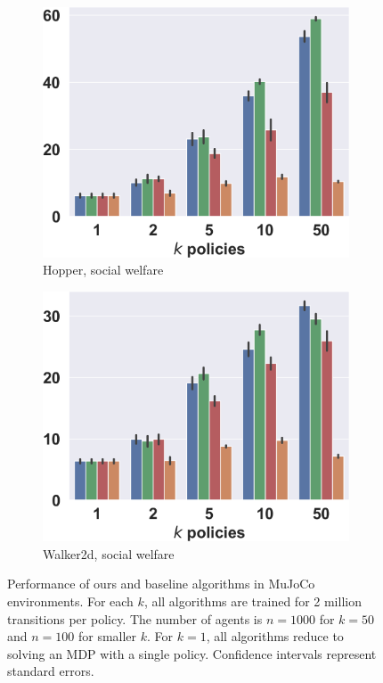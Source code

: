 \documentclass[letterpaper]{article} %
\begin{document}
\begin{figure}[t]
\begin{center}
\begin{subfigure}{0.245\textwidth}
    \end{subfigure}
    \hfill%
    \begin{subfigure}{0.245\textwidth}
        \centering
        \caption{Hopper, social welfare}
        \includegraphics[width=\linewidth]{pics/Hopper-v4_bars.png}
    \end{subfigure}%
    \hfill%
    \begin{subfigure}{0.245\textwidth}
        \centering
        \caption{Walker2d, social welfare}
        \includegraphics[width=\linewidth]{pics/Walker2d-v4_bars.png}
    \end{subfigure}
    
\caption{Performance of ours and baseline algorithms in MuJoCo environments. For each $k$, all algorithms are trained for 2 million transitions per policy. The number of agents is $n=1000$ for $k=50$ and $n=100$ for smaller $k$. For $k=1$, all algorithms reduce to solving an MDP with a single policy. Confidence intervals represent standard errors.}
\label{fig:results_mujoco}
\end{center}
\end{figure}
\end{document}

